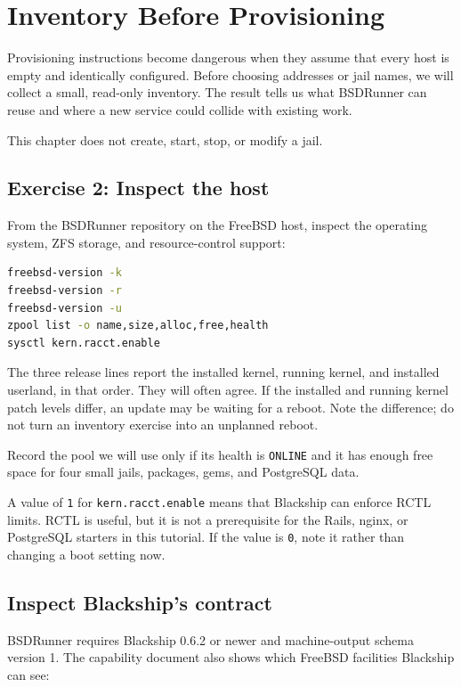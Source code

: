 \chapter{Inventory Before Provisioning}

Provisioning instructions become dangerous when they assume that every host is
empty and identically configured. Before choosing addresses or jail names, we
will collect a small, read-only inventory. The result tells us what BSDRunner
can reuse and where a new service could collide with existing work.

This chapter does not create, start, stop, or modify a jail.

\section{Exercise 2: Inspect the host}

From the BSDRunner repository on the FreeBSD host, inspect the operating system,
ZFS storage, and resource-control support:

\begin{lstlisting}[language=sh]
freebsd-version -k
freebsd-version -r
freebsd-version -u
zpool list -o name,size,alloc,free,health
sysctl kern.racct.enable
\end{lstlisting}

The three release lines report the installed kernel, running kernel, and
installed userland, in that order. They will often agree. If the installed and
running kernel patch levels differ, an update may be waiting for a reboot. Note
the difference; do not turn an inventory exercise into an unplanned reboot.

Record the pool we will use only if its health is \texttt{ONLINE} and it has
enough free space for four small jails, packages, gems, and PostgreSQL data.

A value of \texttt{1} for \texttt{kern.racct.enable} means that Blackship can
enforce RCTL limits. RCTL is useful, but it is not a prerequisite for the Rails,
nginx, or PostgreSQL starters in this tutorial. If the value is \texttt{0}, note
it rather than changing a boot setting now.

\section{Inspect Blackship's contract}

BSDRunner requires Blackship 0.6.2 or newer and machine-output schema version 1.
The capability document also shows which FreeBSD facilities Blackship can see:

